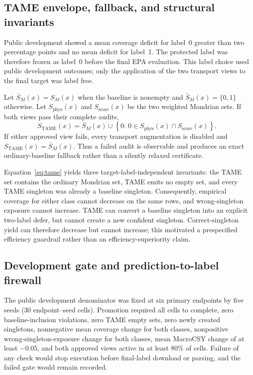 \subsection{TAME envelope, fallback, and structural invariants}
\label{sec:methods_tame}

Public development showed a mean coverage deficit for label~0 greater than two percentage points and no mean deficit for label~1. The protected label was therefore frozen as label~0 before the final EPA evaluation. This label choice used public development outcomes; only the application of the two transport views to the final target was label free.

Let $\bar S_M(x)=S_M(x)$ when the baseline is nonempty and $\bar S_M(x)=\{0,1\}$ otherwise. Let $S_{\mathrm{phys}}(x)$ and $S_{\mathrm{score}}(x)$ be the two weighted Mondrian sets. If both views pass their complete audits,
\begin{equation}
 S_{\mathrm{TAME}}(x)
 =\bar S_M(x)\cup
 \left\{0:\,0\in S_{\mathrm{phys}}(x)\cap S_{\mathrm{score}}(x)\right\}.
 \label{eq:tame}
\end{equation}
If either approved view fails, every transport augmentation is disabled and $S_{\mathrm{TAME}}(x)=\bar S_M(x)$. Thus a failed audit is observable and produces an exact ordinary-baseline fallback rather than a silently relaxed certificate.

Equation~\ref{eq:tame} yields three target-label-independent invariants: the TAME set contains the ordinary Mondrian set, TAME emits no empty set, and every TAME singleton was already a baseline singleton. Consequently, empirical coverage for either class cannot decrease on the same rows, and wrong-singleton exposure cannot increase. TAME can convert a baseline singleton into an explicit two-label defer, but cannot create a new confident singleton. Correct-singleton yield can therefore decrease but cannot increase; this motivated a prespecified efficiency guardrail rather than an efficiency-superiority claim.

\subsection{Development gate and prediction-to-label firewall}
\label{sec:methods_firewall}

The public development denominator was fixed at six primary endpoints by five seeds (30 endpoint--seed cells). Promotion required all cells to complete, zero baseline-inclusion violations, zero TAME empty sets, zero newly created singletons, nonnegative mean coverage change for both classes, nonpositive wrong-singleton-exposure change for both classes, mean MacroCSY change of at least $-0.05$, and both approved views active in at least 80\% of cells. Failure of any check would stop execution before final-label download or parsing, and the failed gate would remain recorded.

